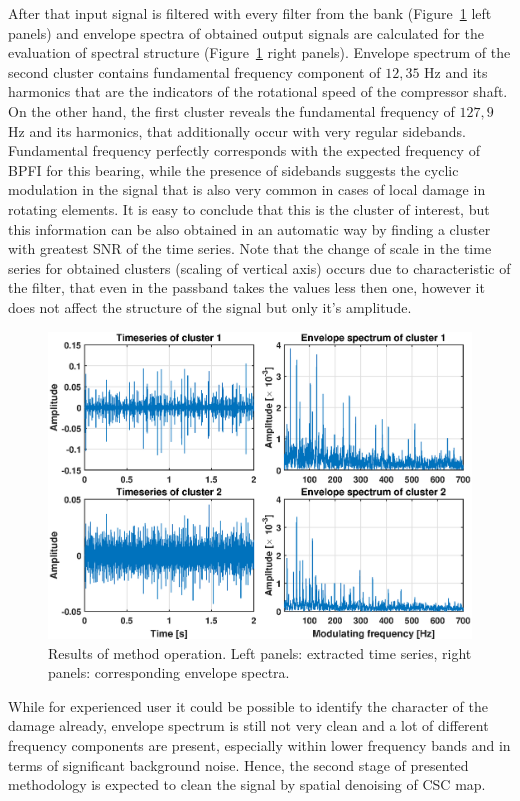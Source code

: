 \documentclass[3p, 12pt]{elsarticle} %
\begin{document}
After that input signal is filtered with every filter from the bank (Figure~\ref{fig:out} left panels) and envelope spectra of obtained output signals are calculated for the evaluation of spectral structure (Figure~\ref{fig:out} right panels). Envelope spectrum of the second cluster contains fundamental frequency component of $12,35$ Hz and its harmonics that are the indicators of the rotational speed of the compressor shaft. On the other hand, the first cluster reveals the fundamental frequency of $127,9$ Hz and its harmonics, that additionally occur with very regular sidebands. Fundamental frequency perfectly corresponds with the expected frequency of BPFI for this bearing, while the presence of sidebands suggests the cyclic modulation in the signal that is also very common in cases of local damage in rotating elements. It is easy to conclude that this is the cluster of interest, but this information can be also obtained in an automatic way by finding a cluster with greatest SNR of the time series. Note that the change of scale in the time series for obtained clusters (scaling of vertical axis) occurs due to characteristic of the filter, that even in the passband takes the values less then one, however it does not affect the structure of the signal but only it's amplitude.

\begin{figure}[ht!]
\centering
\includegraphics[width=.75\textwidth]{wykresy/out}
\caption{Results of method operation. Left panels: extracted time series, right panels: corresponding envelope spectra.}
\label{fig:out}
\end{figure}

While for experienced user it could be possible to identify the character of the damage already, envelope spectrum is still not very clean and a lot of different frequency components are present, especially within lower frequency bands and in terms of significant background noise. Hence, the second stage of presented methodology is expected to clean the signal by spatial denoising of CSC map.
\end{document}
